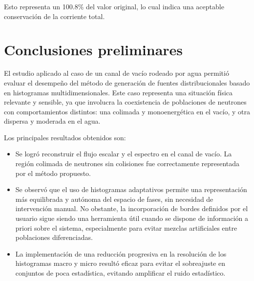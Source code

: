 Esto representa un 100.8\% del valor original, lo cual indica una aceptable conservación de la corriente total. 


\section{Conclusiones preliminares}

El estudio aplicado al caso de un canal de vacío rodeado por agua permitió evaluar el desempeño del método de generación de fuentes distribucionales basado en histogramas multidimensionales. Este caso representa una situación física relevante y sensible, ya que involucra la coexistencia de poblaciones de neutrones con comportamientos distintos: una colimada y monoenergética en el vacío, y otra dispersa y moderada en el agua.

Los principales resultados obtenidos son:

\begin{itemize}
    \item Se logró reconstruir el flujo escalar y el espectro en el canal de vacío. La región colimada de neutrones sin colisiones fue correctamente representada por el método propuesto.
    

    \item Se observó que el uso de histogramas adaptativos permite una representación más equilibrada y autónoma del espacio de fases, sin necesidad de intervención manual. No obstante, la incorporación de bordes definidos por el usuario sigue siendo una herramienta útil cuando se dispone de información a priori sobre el sistema, especialmente para evitar mezclas artificiales entre poblaciones diferenciadas.

    \item La implementación de una reducción progresiva en la resolución de los histogramas macro y micro resultó eficaz para evitar el sobreajuste en conjuntos de poca estadística, evitando amplificar el ruido estadístico.
\end{itemize}



